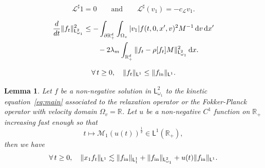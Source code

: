 \documentclass[10pt,a4paper]{amsart}
\newtheorem{lemma}{Lemma}
\def\LL{{\mathcal L}}
\def\MMM{{\mathscr M}}
\newcommand\R{{\mathbb R}}
\newcommand{\dd}{{\, \mathrm d}}
\newcommand{\dt}{\frac{{\rm d}}{{\rm d}t}}
\newcommand{\init}{\text{{\tiny {\rm in}}}}
\newcommand{\sfL}{\mathsf{L}}
\begin{document}
    \begin{equation}\label{eq:prop-Lsharp}
      \LL^\sharp 1 = 0 \qquad \mbox{and}\qquad \LL^\sharp( v_1) = - c_\LL v_1.
    \end{equation}

\begin{align}
  \nonumber  
  \dt \Vert f_t \Vert_{\sfL^2_{\omega_1}}^{2}
  &\le - \int_{\partial \R_+^d} \int_{\Omega_v} |v_1| f(t,0,x',v)^2 M^{-1} \dd v \dd x'  \\
  \label{eq:hypoco}
  &\qquad- 2 \lambda_m  \int_{\R_+^d}   \| f_t - \rho[f_t] M \|_{\sfL^2_{\omega_1}}^2\dd x.
 \end{align}

\begin{equation}
  \label{eq:mass-decay}
  \forall \, t \ge 0, \quad \| f_t \|_{\sfL^{1}} \le \| f_{\init} \|_{\sfL^{1}}.
\end{equation}

\begin{lemma}\label{lem:moments_unbdd_vel}
  Let $f$ be a non-negative solution in $\sfL^2_{\omega_1}$ to the kinetic equation~\eqref{eq:main} associated to  the relaxation operator or the Fokker-Planck operator with velocity domain $\Omega_v = \R$. Let $u$ be a non-negative $C^1$ function on $\R_+$ increasing fast enough so that
  \begin{equation}
    \label{eq:hyp-u}
    t \mapsto \MMM_1(u(t))^{\frac{1}{2}} \in \sfL^1(\R_+),
  \end{equation}
  then we have
  \begin{equation}\label{eq:lem:moment2}
    \forall \, t \ge 0, \quad \| x_1 f_t \|_{\sfL^{1}} \lesssim
    \| f_\init \|_{\sfL^1_1} +  \| f_\init \|_{\sfL^2_{\omega_1}} + u(t) \| f_\init \|_{\sfL^1}.
  \end{equation}
\end{lemma}
\end{document}
